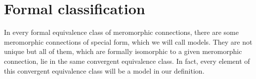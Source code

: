  

\begin{comment}
  \subsection{Ramification}
  \marginnote{\cite[I.5.4.1]{sabbah_cimpa90}}
\end{comment}

\section{Formal classification}\label{sec:formalClassification}
In every formal equivalence class of meromorphic connections, there are some
meromorphic connections of special form, which we will call models. They are
not unique but all of them, which are formally isomorphic to a given
meromorphic connection, lie in the same convergent equivalence class.
In fact, every element of this convergent equivalence class will be a model in
our definition.

